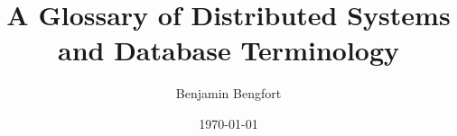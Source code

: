 \documentclass[12pt]{article}
\title{A Glossary of Distributed Systems and Database Terminology}
\author{Benjamin Bengfort}
\date{\today}
\begin{document}
\maketitle

\glsaddall
\printglossaries
\end{document}
